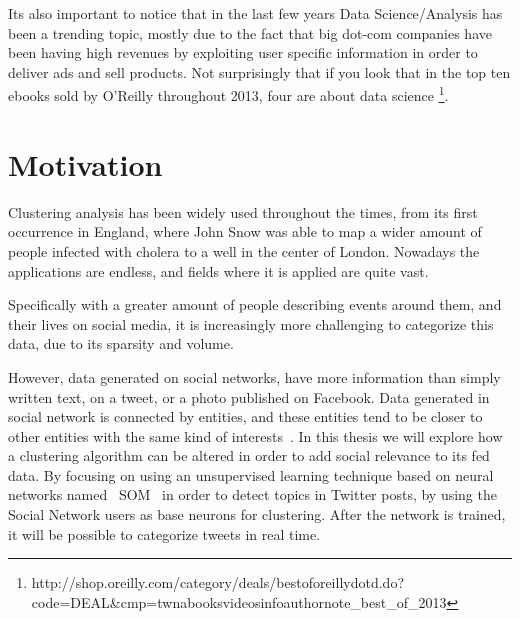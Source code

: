 Its also important to notice that in the last few years Data Science/Analysis has been a trending topic, mostly due to the fact that big dot-com companies have been having high revenues by exploiting user specific information in order to deliver ads and sell products. Not surprisingly that if you look that in the top ten ebooks sold by O'Reilly throughout 2013, four are about data science \footnote{http://shop.oreilly.com/category/deals/best\-of\-oreilly\-dotd.do?code=DEAL\&cmp=tw\-na\-books\-videos\-info\-authornote\_best\_of\_2013}.
 

\section{Motivation}
Clustering analysis has been widely used throughout the times, from its first occurrence in England, where John Snow was able to map a wider amount of people infected with cholera to a well in the center of London. Nowadays the applications are endless, and fields where it is applied are quite vast.

Specifically with a greater amount of people describing events around them, and their lives on social media, it is increasingly more challenging to categorize this data, due to its sparsity and volume. 

However, data generated on social networks, have more information than simply written text, on a tweet, or a photo published on Facebook. Data generated in social network is connected by entities, and these entities tend to be closer to other entities with the same kind of interests~\cite{McPherson2001}. In this thesis we will explore how a clustering algorithm can be altered in order to add social relevance to its fed data. By focusing  on using an unsupervised learning technique based on neural networks named ~\ac{SOM}~\cite{Kohonen1990} in order to detect topics in Twitter posts, by using the Social Network users as base neurons for clustering. After the network is trained, it will be possible to categorize tweets in real time. 

